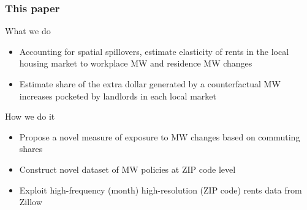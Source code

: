 \documentclass[aspectratio=169, t]{beamer}
\begin{document}
\begin{frame}
    \frametitle{This paper}
    
    What we do
    \begin{itemize}
        \vspace{.5mm} \item Accounting for spatial spillovers, estimate 
        elasticity of rents in the local housing market to
         {\color{blue} workplace MW} and {\color{red} residence MW} changes
        \vspace{.5mm} \item Estimate share of the extra dollar generated by a
        counterfactual MW increases pocketed by landlords in each local market
    \end{itemize}
    
    \vspace{3mm}
    \pause
    How we do it
    \begin{itemize}
        \vspace{.5mm} \item Propose a novel measure of exposure to MW changes 
        based on commuting shares
        \vspace{.5mm} \item Construct novel dataset of MW policies at ZIP code level
        \vspace{.5mm} \item Exploit high-frequency (month) high-resolution 
        (ZIP code) rents data from Zillow
    \end{itemize}
\end{frame}
\end{document}
